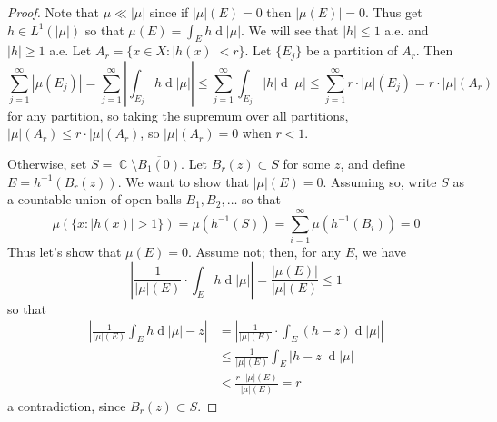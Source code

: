 \documentclass[12pt, a4paper]{book}
\DeclareMathOperator{\C}{\mathbb{C}}
\renewcommand{\d}[1]{\ensuremath{\operatorname{d}\!{#1}}} %
\theoremstyle{nonumberplain}
\newtheorem{proof}{Proof}
\begin{document}
\begin{proof}
    Note that $\mu\ll|\mu|$ since if $|\mu|(E)=0$ then $|\mu(E)|=0$.
    Thus get $h\in L^1(|\mu|)$ so that $\mu(E)=\int_E h\d{|\mu|}$.
    We will see that $|h|\leq 1$ a.e. and $|h|\geq 1$ a.e.
    Let $A_r=\{x\in X:|h(x)|<r\}$.
    Let $\{E_j\}$ be a partition of $A_r$.
    Then
    \[\sum\limits_{j=1}^\infty|\mu(E_j)|=\sum\limits_{j=1}^\infty\left\lvert\int_{E_j}h\d{|\mu|}\right\rvert\leq\sum\limits_{j=1}^\infty\int_{E_j}|h|\d{|\mu|}\leq\sum\limits_{j=1}^\infty r\cdot|\mu|(E_j)=r\cdot|\mu|(A_r)\]
    for any partition, so taking the supremum over all partitions, $|\mu|(A_r)\leq r\cdot|\mu|(A_r)$, so $|\mu|(A_r)=0$ when $r<1$.

    Otherwise, set $S=\C\setminus\overline{B_1(0)}$.
    Let $B_r(z)\subset S$ for some $z$, and define $E=h^{-1}(B_r(z))$.
    We want to show that $|\mu|(E)=0$.
    Assuming so, write $S$ as a countable union of open balls $B_1,B_2,\ldots$ so that
    \[\mu(\{x:|h(x)|>1\})=\mu(h^{-1}(S))=\sum\limits_{i=1}^\infty\mu(h^{-1}(B_i))=0\]
    Thus let's show that $\mu(E)=0$.
    Assume not; then, for any $E$, we have
    \[\left\lvert\frac{1}{|\mu|(E)}\cdot\int_E h\d{|\mu|}\right\rvert=\frac{|\mu(E)|}{|\mu|(E)}\leq 1\]
    so that
    \begin{align*}
        \left\lvert\frac{1}{|\mu|(E)}\int_E h\d{|\mu|}-z\right\rvert&=  \left\lvert\frac{1}{|\mu|(E)}\cdot\int_E(h-z)\d{|\mu|}\right\rvert\\
                                                                    &\leq\frac{1}{|\mu|(E)}\int_E|h-z|\d{|\mu|}\\
                                                                    &< \frac{r\cdot|\mu|(E)}{|\mu|(E)}=r
    \end{align*}
    a contradiction, since $B_r(z)\subset S$.
\end{proof}
\end{document}

